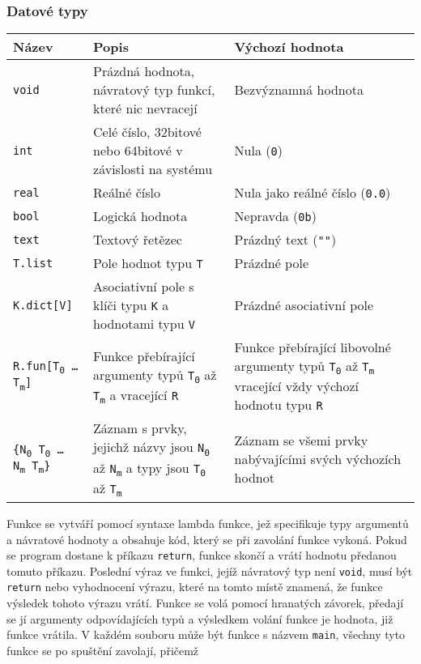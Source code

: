 \documentclass[a4paper,12pt]{article}
\def\quote #1{"#1"}
\begin{document}
\subsubsection{Datové typy}
\begin{tabular}{|m{3.5cm} m{6cm} m{5cm}|}\hline
Název & Popis & Výchozí hodnota \\\hline
\texttt{void} & Prázdná hodnota, návratový typ funkcí, které nic nevracejí & Bezvýznamná hodnota\\\hline
\texttt{int} & Celé číslo, 32bitové nebo 64bitové v závislosti na systému & Nula (\texttt{0})\\\hline
\texttt{real} & Reálné číslo & Nula jako reálné číslo (\texttt{0.0})\\\hline
\texttt{bool} & Logická hodnota & Nepravda (\texttt{0b})\\\hline
\texttt{text} & Textový řetězec & Prázdný text (\texttt{\quote{}})\\\hline
\texttt{T.list} & Pole hodnot typu \texttt{T} & Prázdné pole\\\hline
\texttt{K.dict[V]} & Asociativní pole s klíči typu \texttt{K} a hodnotami typu \texttt{V} & Prázdné asociativní pole\\\hline
\texttt{R.fun[T\textsubscript{0} \ldots{} T\textsubscript{m}]} & Funkce přebírající argumenty typů \texttt{T\textsubscript{0}} až \texttt{T\textsubscript{m}} a vracející \texttt{R} & Funkce přebírající libovolné argumenty typů \texttt{T\textsubscript{0}} až \texttt{T\textsubscript{m}} vracející vždy výchozí hodnotu typu \texttt{R}\\\hline
\texttt{\{N\textsubscript{0} T\textsubscript{0} \ldots{} N\textsubscript{m} T\textsubscript{m}\}} & Záznam s prvky, jejichž názvy jsou \texttt{N\textsubscript{0}} až \texttt{N\textsubscript{m}} a typy jsou \texttt{T\textsubscript{0}} až \texttt{T\textsubscript{m}} & Záznam se všemi prvky nabývajícími svých výchozích hodnot\\\hline
\end{tabular}

Funkce se vytváří pomocí syntaxe lambda funkce, jež specifikuje typy argumentů a návratové hodnoty a obsahuje kód, který se při zavolání funkce vykoná. Pokud se program dostane k příkazu \texttt{return}, funkce skončí a vrátí hodnotu předanou tomuto příkazu. Poslední výraz ve funkci, jejíž návratový typ není \texttt{void}, musí být \texttt{return} nebo vyhodnocení výrazu, které na tomto místě znamená, že funkce výsledek tohoto výrazu vrátí. Funkce se volá pomocí hranatých závorek, předají se jí argumenty odpovídajících typů a výsledkem volání funkce je hodnota, již funkce vrátila. V každém souboru může být funkce s názvem \texttt{main}, všechny tyto funkce se po spuštění zavolají, přičemž 
\end{document}
